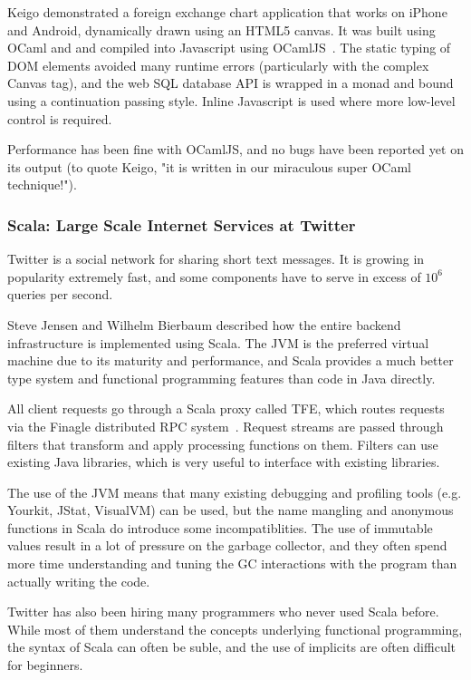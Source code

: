 \documentclass{jfp1}
\begin{document}
Keigo demonstrated a foreign exchange chart application that works on iPhone
and Android, dynamically drawn using an HTML5 canvas. It was built using OCaml
and and compiled into Javascript using OCamlJS~\cite{x}. The static typing of
DOM elements avoided many runtime errors (particularly with the complex Canvas
tag), and the web SQL database API is wrapped in a monad and bound using a
continuation passing style. Inline Javascript is used where more low-level
control is required.

Performance has been fine with OCamlJS, and no bugs have been reported yet on
its output (to quote Keigo, "it is written in our miraculous super OCaml
technique!").

\subsubsection{Scala: Large Scale Internet Services at Twitter}

Twitter is a social network for sharing short text messages. It is growing in
popularity extremely fast, and some components have to serve in excess of
$10^6$ queries per second.

Steve Jensen and Wilhelm Bierbaum described how the entire backend
infrastructure is implemented using Scala.  The JVM is the preferred virtual
machine due to its maturity and performance, and Scala provides a much better
type system and functional programming features than code in Java directly.

All client requests go through a Scala proxy called TFE, which routes requests
via the Finagle distributed RPC system~\cite{f}. Request streams are passed
through filters that transform and apply processing functions on them.  Filters
can use existing Java libraries, which is very useful to interface with
existing libraries. 

The use of the JVM means that many existing debugging and profiling tools (e.g.
Yourkit, JStat, VisualVM) can be used, but the name mangling and anonymous
functions in Scala do introduce some incompatiblities.  The use of immutable
values result in a lot of pressure on the garbage collector, and they often
spend more time understanding and tuning the GC interactions with the program
than actually writing the code.

Twitter has also been hiring many programmers who never used Scala before.
While most of them understand the concepts underlying functional programming,
the syntax of Scala can often be suble, and the use of implicits are often
difficult for beginners.
\end{document}
